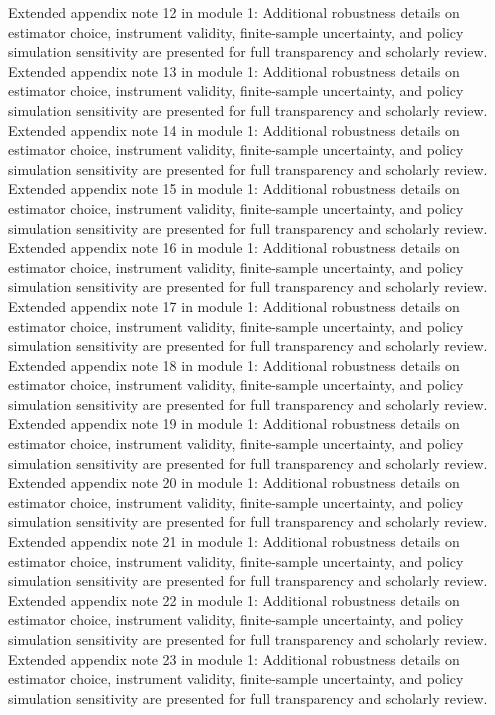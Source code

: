 \documentclass[preprint,12pt]{elsarticle}
\begin{document}
Extended appendix note 12 in module 1: Additional robustness details on estimator choice, instrument validity, finite-sample uncertainty, and policy simulation sensitivity are presented for full transparency and scholarly review.
Extended appendix note 13 in module 1: Additional robustness details on estimator choice, instrument validity, finite-sample uncertainty, and policy simulation sensitivity are presented for full transparency and scholarly review.
Extended appendix note 14 in module 1: Additional robustness details on estimator choice, instrument validity, finite-sample uncertainty, and policy simulation sensitivity are presented for full transparency and scholarly review.
Extended appendix note 15 in module 1: Additional robustness details on estimator choice, instrument validity, finite-sample uncertainty, and policy simulation sensitivity are presented for full transparency and scholarly review.
Extended appendix note 16 in module 1: Additional robustness details on estimator choice, instrument validity, finite-sample uncertainty, and policy simulation sensitivity are presented for full transparency and scholarly review.
Extended appendix note 17 in module 1: Additional robustness details on estimator choice, instrument validity, finite-sample uncertainty, and policy simulation sensitivity are presented for full transparency and scholarly review.
Extended appendix note 18 in module 1: Additional robustness details on estimator choice, instrument validity, finite-sample uncertainty, and policy simulation sensitivity are presented for full transparency and scholarly review.
Extended appendix note 19 in module 1: Additional robustness details on estimator choice, instrument validity, finite-sample uncertainty, and policy simulation sensitivity are presented for full transparency and scholarly review.
Extended appendix note 20 in module 1: Additional robustness details on estimator choice, instrument validity, finite-sample uncertainty, and policy simulation sensitivity are presented for full transparency and scholarly review.
Extended appendix note 21 in module 1: Additional robustness details on estimator choice, instrument validity, finite-sample uncertainty, and policy simulation sensitivity are presented for full transparency and scholarly review.
Extended appendix note 22 in module 1: Additional robustness details on estimator choice, instrument validity, finite-sample uncertainty, and policy simulation sensitivity are presented for full transparency and scholarly review.
Extended appendix note 23 in module 1: Additional robustness details on estimator choice, instrument validity, finite-sample uncertainty, and policy simulation sensitivity are presented for full transparency and scholarly review.
\end{document}

